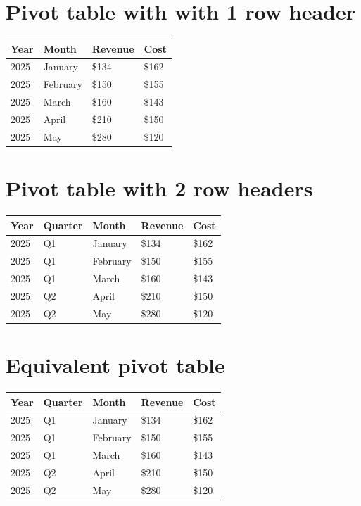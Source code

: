 \documentclass[11pt,a4paper]{article}
\begin{document}
\section{Pivot table with with 1 row header}

\begin{table}[h]
\begin{tabular}{|l|l|l|l|}
\hline
Year & Month & Revenue & Cost \\ \hline
2025 & January & \$134 & \$162 \\ \hline
2025 & February & \$150 & \$155 \\ \hline
2025 & March & \$160 & \$143 \\ \hline
2025 & April & \$210 & \$150 \\ \hline
2025 & May & \$280 & \$120 \\ \hline
\end{tabular}
\end{table}

\section{Pivot table with 2 row headers}

\begin{table}[h]
\begin{tabular}{|l|l|l|l|l|}
\hline
Year & Quarter & Month & Revenue & Cost \\ \hline
2025 & Q1 & January & \$134 & \$162 \\ \hline
2025 & Q1 & February & \$150 & \$155 \\ \hline
2025 & Q1 & March & \$160 & \$143 \\ \hline
2025 & Q2 & April & \$210 & \$150 \\ \hline
2025 & Q2 & May & \$280 & \$120 \\ \hline
\end{tabular}
\end{table}

\section{Equivalent pivot table}

\begin{table}[h]
\begin{tabular}{|l|l|l|l|l|}
\hline
Year & Quarter & Month & Revenue & Cost \\ \hline
2025 & Q1 & January & \$134 & \$162 \\ \hline
2025 & Q1 & February & \$150 & \$155 \\ \hline
2025 & Q1 & March & \$160 & \$143 \\ \hline
2025 & Q2 & April & \$210 & \$150 \\ \hline
2025 & Q2 & May & \$280 & \$120 \\ \hline
\end{tabular}
\end{table}
\end{document}
